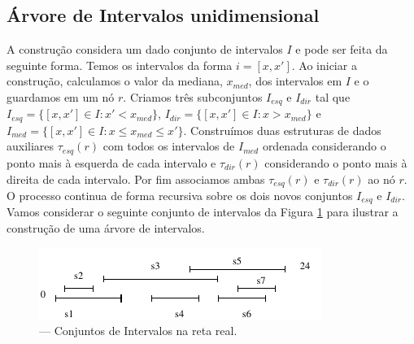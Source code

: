 \subsection{Árvore de Intervalos unidimensional}
A construção considera um dado conjunto de intervalos $I$ e pode ser feita da seguinte forma. Temos os intervalos da forma $i = [x,x']$. Ao iniciar a construção, calculamos o valor da mediana, $x_{med}$, dos intervalos em $I$ e o guardamos em um nó $r$. Criamos três subconjuntos $I_{esq}$ e $I_{dir}$ tal que $I_{esq} = \{[x, x'] \in I : x' < x_{med} \}$, $I_{dir} = \{[x, x'] \in I : x > x_{med} \}$ e $I_{med} = \{[x, x'] \in I : x \leq x_{med} \leq x' \}$. Construímos duas estruturas de dados auxiliares $\tau_{esq}(r)$ com todos os intervalos de $I_{med}$ ordenada considerando o ponto mais à esquerda de cada intervalo e $\tau_{dir}(r)$ considerando o ponto mais à direita de cada intervalo. Por fim associamos ambas  $\tau_{esq}(r)$  e  $\tau_{dir}(r)$ ao nó $r$. O processo continua de forma recursiva sobre os dois novos conjuntos $I_{esq}$ e $I_{dir}$. Vamos considerar o seguinte conjunto de intervalos da Figura \ref{fig:18} para ilustrar a construção de uma árvore de intervalos.

\begin{figure}[h!]
    \begin{center}
        \includegraphics[scale=1.5]{images/interval_tree5.pdf}
    \end{center}
    \caption {— Conjuntos de Intervalos na reta real.}
    \label{fig:18}
\end{figure}

